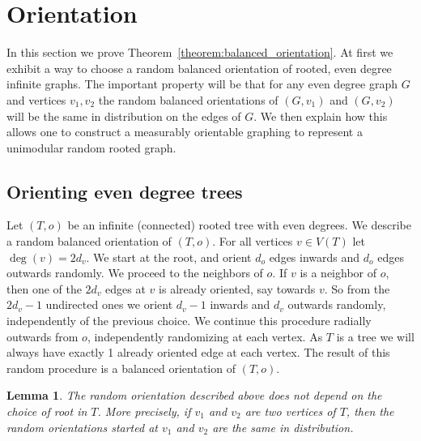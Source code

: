 \documentclass[11pt]{article}
\newtheorem{lemm}[theo]{Lemma}
\theoremstyle{definition}
\numberwithin{equation}{section}
\numberwithin{figure}{section}
\numberwithin{table}{section}
\begin{document}
\section{Orientation} \label{section:orientation}

In this section we prove Theorem~\ref{theorem:balanced_orientation}. At first we exhibit a way to choose a random balanced orientation of rooted, even degree infinite graphs. The important property will be that for any even degree graph $G$ and vertices $v_1, v_2$ the random balanced orientations of $(G, v_1)$ and $(G,v_2)$ will be the same in distribution on the edges of $G$. We then explain how this allows one to construct a measurably orientable graphing to represent a unimodular random rooted graph.

\subsection{Orienting even degree trees} \label{subsection:orienting_trees}
Let $(T,o)$ be an infinite (connected) rooted tree with even degrees. We describe a random balanced orientation of $(T,o)$. For all vertices $v \in V(T)$ let $\deg(v)=2d_v$. We start at the root, and orient $d_o$ edges inwards and $d_o$ edges outwards randomly. We proceed to the neighbors of $o$. If $v$ is a neighbor of $o$, then one of the $2 d_v$ edges at $v$ is already oriented, say towards $v$. So from the $2d_v-1$ undirected ones we orient $d_v-1$ inwards and $d_v$ outwards randomly, independently of the previous choice. We continue this procedure radially outwards from $o$, independently randomizing at each vertex. As $T$ is a tree we will always have exactly 1 already oriented edge at each vertex. The result of this random procedure is a balanced orientation of $(T,o)$.

\begin{lemm}
The random orientation described above does not depend on the choice of root in $T$. More precisely, if $v_1$ and $v_2$ are two vertices of $T$, then the random orientations started at $v_1$ and $v_2$ are the same in distribution.
\end{lemm}
\end{document}
